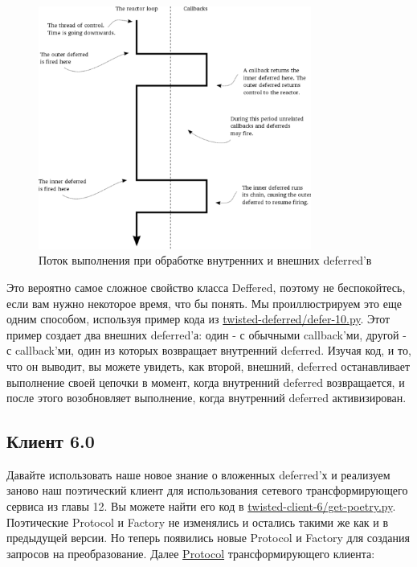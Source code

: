 \begin{figure}[h]
\begin{center}
    \includegraphics[width=0.8\textwidth]{images/deferred-12.pdf}
    \caption{Поток выполнения при обработке внутренних и внешних deferred'в\label{fig:deferred-12}}
\end{center}
\end{figure}

Это вероятно самое сложное свойство класса Deffered, 
поэтому не беспокойтесь, если вам нужно некоторое время, 
что бы понять. Мы проиллюстрируем это еще одним способом, 
используя пример кода из 
\href{http://github.com/jdavisp3/twisted-intro/blob/master/twisted-deferred/defer-10.py#L1}{twisted-deferred/defer-10.py}. Этот пример создает два внешних deferred'а: 
один - с обычными callback'ми, другой - с callback'ми, один из которых 
возвращает внутренний deferred. Изучая код, и то, что он выводит, 
вы можете увидеть, как второй, внешний, deferred останавливает 
выполнение своей цепочки в момент, когда внутренний  
deferred возвращается,  и после этого возобновляет выполнение, когда 
внутренний deferred активизирован.


\subsection{Клиент 6.0}


Давайте использовать наше новое знание о вложенных 
deferred'х и реализуем заново наш поэтический клиент для 
использования сетевого трансформирующего сервиса из 
главы 12. Вы можете найти его код в 
\href{http://github.com/jdavisp3/twisted-intro/blob/master/twisted-client-6/get-poetry.py#L1}{twisted-client-6/get-poetry.py}. Поэтические Protocol и Factory не 
изменялись и остались такими же как и в предыдущей версии. 
Но теперь появились новые Protocol и Factory для создания запросов 
на преобразование. Далее 
\href{http://github.com/jdavisp3/twisted-intro/blob/master/twisted-client-6/get-poetry.py#L85}{Protocol} 
трансформирующего клиента:

